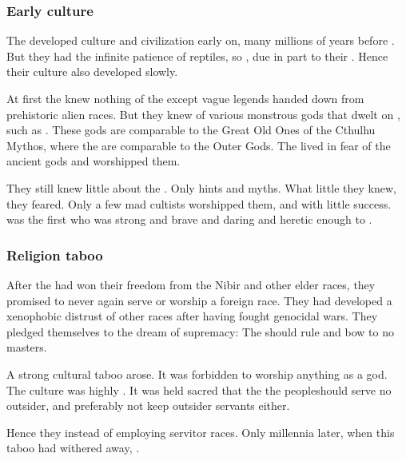 \subsubsection{Early \ophidian culture}
The \ophidians developed culture and civilization early on, many millions of years before \Tiamat. 
But they had the infinite patience of reptiles, so , due in part to their .
Hence their culture also developed slowly. 

At first the \ophidians knew nothing of the \xss except vague legends handed down from prehistoric alien races. 
But they knew of various monstrous gods that dwelt on \Miith, such as \Ubloth. 
These \Miithian gods are comparable to the Great Old Ones of the Cthulhu Mythos, where the \xss are comparable to the Outer Gods. 
The \ophidians lived in fear of the ancient gods and worshipped them. 

They still knew little about the \xss. 
Only hints and myths.
What little they knew, they feared.
Only a few mad cultists worshipped them, and with little success.
\Sethicus was the first who was strong and brave and daring and heretic enough to . 





\subsubsection{Religion taboo}
After the \ophidians had won their freedom from the Nibir and other elder races, they promised to never again serve or worship a foreign race. 
They had developed a xenophobic distrust of other races after having fought genocidal wars. 
They pledged themselves to the dream of \ophidian supremacy:
The \ophidians should rule and bow to no masters. 

A strong cultural taboo arose. 
It was forbidden to worship anything as a god. 
The \ophidian culture was highly . 
It was held sacred that the \dash the \caisith people\dash should serve no outsider, and preferably not keep outsider servants either. 

Hence they  instead of employing servitor races. 
Only millennia later, when this taboo had withered away, . 

